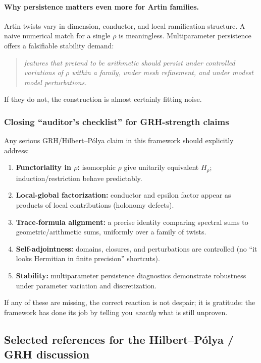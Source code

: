 \documentclass[11pt,oneside]{amsbook}
\numberwithin{equation}{section}
\theoremstyle{plain}
\theoremstyle{definition}
\theoremstyle{remark}
\begin{document}
\paragraph{Why persistence matters even more for Artin families.}
Artin twists vary in dimension, conductor, and local ramification structure.
A naive numerical match for a single $\rho$ is meaningless.
Multiparameter persistence offers a falsifiable stability demand:
\begin{quote}
\emph{features that pretend to be arithmetic should persist under controlled variations of $\rho$ within a family, under mesh refinement, and under modest model perturbations.}
\end{quote}
If they do not, the construction is almost certainly fitting noise.

\subsubsection{Closing ``auditor's checklist'' for GRH-strength claims}

Any serious GRH/Hilbert--Pólya claim in this framework should explicitly address:

\begin{enumerate}[label=(\Alph*)]
\item \textbf{Functoriality in $\rho$:} isomorphic $\rho$ give unitarily equivalent $H_\rho$; induction/restriction behave predictably.
\item \textbf{Local-global factorization:} conductor and epsilon factor appear as products of local contributions (holonomy defects).
\item \textbf{Trace-formula alignment:} a precise identity comparing spectral sums to geometric/arithmetic sums, uniformly over a family of twists.
\item \textbf{Self-adjointness:} domains, closures, and perturbations are controlled (no ``it looks Hermitian in finite precision'' shortcuts).
\item \textbf{Stability:} multiparameter persistence diagnostics demonstrate robustness under parameter variation and discretization.
\end{enumerate}

If any of these are missing, the correct reaction is not despair; it is gratitude:
the framework has done its job by telling you \emph{exactly} what is still unproven.

\subsection*{Selected references for the Hilbert--Pólya / GRH discussion}
\end{document}
